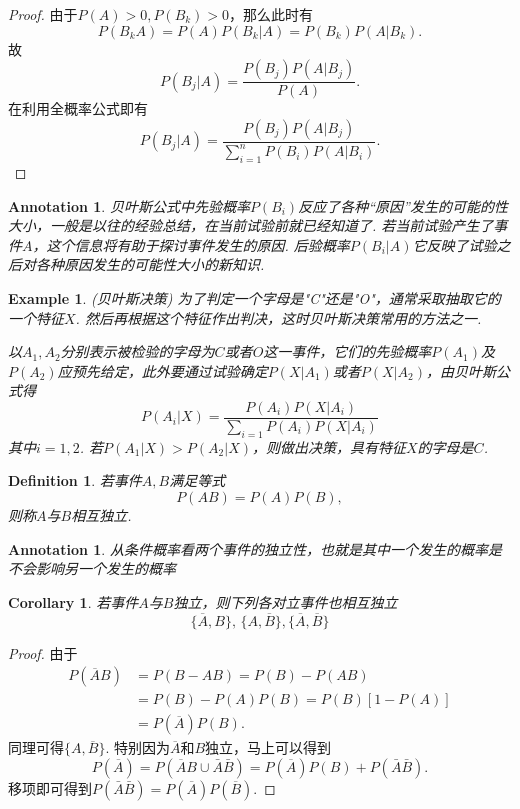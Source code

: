 \documentclass{article}
\newtheorem{corollary}[theorem]{Corollary}
\newtheorem{example}[theorem]{Example}
\newtheorem{definition}[theorem]{Definition}
\newtheorem{annotation}[theorem]{Annotation}
\begin{document}
\begin{proof}
由于$P(A) > 0,P(B_k) > 0$，那么此时有
$$
P(B_kA) = P(A)P(B_k|A) = P(B_k)P(A|B_k). 
$$
故
$$
P(B_j|A) = \frac{P(B_j)P(A|B_j)}{P(A)}.
$$
在利用全概率公式即有
$$
P(B_j|A) = \frac{P(B_j)P(A|B_j)}{\sum\limits_{i =1}^n P(B_i)P(A|B_i)}.
$$
\end{proof}

\begin{annotation}
\rm 贝叶斯公式中先验概率$P(B_i)$反应了各种“原因”发生的可能的性大小，一般是以往的经验总结，在当前试验前就已经知道了. 若当前试验产生了事件$A$，这个信息将有助于探讨事件发生的原因. 后验概率$P(B_i|A)$它反映了试验之后对各种原因发生的可能性大小的新知识.
\end{annotation}

\begin{example}
\rm {\color{red}(贝叶斯决策)} 为了判定一个字母是"C"还是"O"，通常采取抽取它的一个特征$X$. 然后再根据这个特征作出判决，这时贝叶斯决策常用的方法之一. 

以$A_1,A_2$分别表示被检验的字母为$C$或者$O$这一事件，它们的先验概率$P(A_1)$及$P(A_2)$应预先给定，此外要通过试验确定$P(X|A_1)$或者$P(X|A_2)$，由贝叶斯公式得
$$
P(A_i|X) = \frac{P(A_i)P(X|A_i)}{\sum\limits_{i=1}P(A_i)P(X|A_i)} 
$$
其中$i=1,2$. 若$P(A_1 | X) > P(A_2 | X)$，则做出决策，具有特征$X$的字母是$C$.
\end{example}

\begin{definition}
\rm 若事件$A,B$满足等式
$$
P(AB) = P(A)P(B),
$$
则称$A$与$B${\color{red}相互独立}. 
\end{definition}

\begin{annotation}
\rm {\color{blue} 从条件概率看两个事件的独立性，也就是其中一个发生的概率是不会影响另一个发生的概率}
\end{annotation}

\begin{corollary}
\rm 若事件$A$与$B$独立，则下列各对立事件也相互独立
$$
\{\overline{A}, B\},\, \{A,\overline{B}\}, \{\overline{A},\overline{B}\}
$$
\end{corollary}

\begin{proof}
由于
$$
\begin{array}{ll}
P(\overline{A}B) &= P(B-AB)=P(B)-P(AB)\\
&= P(B)-P(A)P(B) = P(B)[1-P(A)]\\
&= P(\overline{A})P(B).  
\end{array}
$$
同理可得$\{A,\overline{B}\}$. 特别因为$\overline{A}$和$B$独立，马上可以得到
$$
P(\overline{A}) = P(\overline{A}B \cup \bar{A}\bar{B}) = P(\overline{A})P(B) + P(\bar{A}\bar{B}). 
$$
移项即可得到$P(\bar{A}\bar{B}) = P(\overline{A})P(\overline{B})$. 
\end{proof}
\end{document}
